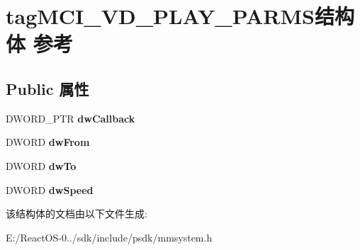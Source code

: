 \hypertarget{structtag_m_c_i___v_d___p_l_a_y___p_a_r_m_s}{}\section{tag\+M\+C\+I\+\_\+\+V\+D\+\_\+\+P\+L\+A\+Y\+\_\+\+P\+A\+R\+M\+S结构体 参考}
\label{structtag_m_c_i___v_d___p_l_a_y___p_a_r_m_s}
\subsection*{Public 属性}
\begin{DoxyCompactItemize}
\item 
\mbox{\label{structtag_m_c_i___v_d___p_l_a_y___p_a_r_m_s_a764a8402810c2e6d5f9aadbb0af32ff7}} 
D\+W\+O\+R\+D\+\_\+\+P\+TR {\bfseries dw\+Callback}
\item 
\mbox{\label{structtag_m_c_i___v_d___p_l_a_y___p_a_r_m_s_ab3c6d530aa6beab2600b62ab2c21e362}} 
D\+W\+O\+RD {\bfseries dw\+From}
\item 
\mbox{\label{structtag_m_c_i___v_d___p_l_a_y___p_a_r_m_s_a5967a2afddcc83cffcd3acfd73ac2423}} 
D\+W\+O\+RD {\bfseries dw\+To}
\item 
\mbox{\label{structtag_m_c_i___v_d___p_l_a_y___p_a_r_m_s_adbc44e0f04fda959659fe3287db4de0c}} 
D\+W\+O\+RD {\bfseries dw\+Speed}
\end{DoxyCompactItemize}


该结构体的文档由以下文件生成\+:\begin{DoxyCompactItemize}
\item 
E\+:/\+React\+O\+S-\/0../sdk/include/psdk/mmsystem.\+h\end{DoxyCompactItemize}
